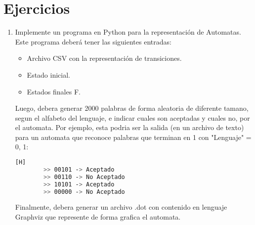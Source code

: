 \documentclass{article}
\begin{document}
	\section{Ejercicios}\label{sec:ejercicios}
	\begin{enumerate}
		\item Implemente un programa en Python para la representación de Automatas. Este programa deberá tener las siguientes entradas:
		\begin{itemize}
			\item Archivo CSV con la representación de transiciones.
            \item Estado inicial.
            \item Estados finales F.
       \end{itemize}	

       Luego, debera generar 2000 palabras de forma aleatoria de diferente tamano, segun el alfabeto del lenguaje, e indicar cuales son aceptadas y cuales no, por el automata. Por ejemplo, esta podria ser la salida (en un archivo de texto) para un automata que reconoce palabras que terminan en 1 con "Lenguaje" = {0, 1}:

        \begin{lstlisting}[language=bash,caption={Definición del resultado esperado}][H]
        >> 00101 -> Aceptado
        >> 00110 -> No Aceptado
        >> 10101 -> Aceptado
        >> 00000 -> No Aceptado
    	\end{lstlisting}
     
        Finalmente, debera generar un archivo .dot con contenido en lenguaje Graphviz que represente de forma grafica el automata.
        
        \end{enumerate}

        \newpage
        \vspace*{2.5px}
\end{document}
